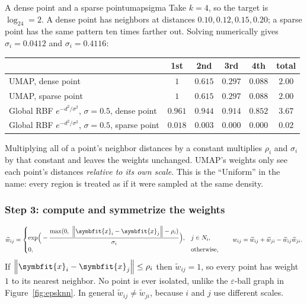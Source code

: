 \documentclass[11pt]{article}
\newcommand{\bm}[1]{\symbfit{#1}}
\newcommand{\vx}{\bm{x}}
\newcommand{\norm}[1]{\left\lVert #1\right\rVert}
\begin{document}
\begin{example}{A dense point and a sparse point}{umapsigma}
Take $k=4$, so the target is $\log_24=2$. A dense point has neighbors at distances $0.10,0.12,0.15,0.20$; a sparse point has the same pattern ten times farther out.
Solving numerically gives $\sigma_i=0.0412$ and $\sigma_i=0.4116$:
\begin{center}
\small
\renewcommand{\arraystretch}{1.25}
\begin{tabular}{lcccc|c}
\toprule
& 1st & 2nd & 3rd & 4th & total\\
\midrule
UMAP, dense point & $1$ & $0.615$ & $0.297$ & $0.088$ & $2.00$\\
UMAP, sparse point & $1$ & $0.615$ & $0.297$ & $0.088$ & $2.00$\\
\midrule
Global RBF $e^{-d^2/\sigma^2}$, $\sigma=0.5$, dense point & $0.961$ & $0.944$ & $0.914$ & $0.852$ & $3.67$\\
Global RBF $e^{-d^2/\sigma^2}$, $\sigma=0.5$, sparse point & $0.018$ & $0.003$ & $0.000$ & $0.000$ & $0.02$\\
\bottomrule
\end{tabular}
\end{center}
Multiplying all of a point's neighbor distances by a constant multiplies $\rho_i$ and $\sigma_i$ by that constant and leaves the weights unchanged. UMAP's weights only see each point's
distances \emph{relative to its own scale}. This is the ``Uniform'' in the name: every region is treated as if it were sampled at the same density.
\end{example}

\subsubsection*{Step 3: compute and symmetrize the weights}
\[
\widetilde w_{ij}=\begin{cases}\exp\!\Big(-\dfrac{\max(0,\ \norm{\vx_i-\vx_j}-\rho_i)}{\sigma_i}\Big), & j\in N_i,\\[1ex] 0,&\text{otherwise,}\end{cases}
\qquad
w_{ij}=\widetilde w_{ij}+\widetilde w_{ji}-\widetilde w_{ij}\widetilde w_{ji}.
\]
If $\norm{\vx_i-\vx_j}\le\rho_i$ then $\widetilde w_{ij}=1$, so every point has weight $1$ to its nearest neighbor. No point is ever isolated, unlike the $\varepsilon$-ball graph in Figure~\ref{fig:epsknn}.
In general $\widetilde w_{ij}\ne\widetilde w_{ji}$, because $i$ and $j$ use different scales.
\end{document}
